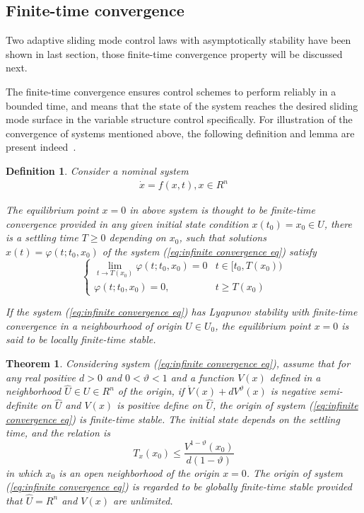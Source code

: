 \documentclass[3p]{elsarticle}
\theoremstyle{plain}
\newtheorem{mydef}{Definition}
\newtheorem{thm}{Theorem}
\begin{document}
\subsection{Finite-time convergence}
Two adaptive sliding mode control laws with asymptotically stability have been shown in last section, those finite-time convergence property will be discussed next.\par
The finite-time convergence ensures control schemes to perform reliably in a bounded time, and means that the state of the system reaches the desired sliding mode surface in the variable structure control specifically. For illustration of the convergence of systems mentioned above, the following definition and lemma are present indeed~\cite{Zhang2012Finite}.
\begin{mydef}
Consider a nominal system
\begin{align}
\dot x = f(x,t),x\in R^n\label{eq:infinite convergence eq}
\end{align}\par
The equilibrium point $x=0$ in above system is thought to be finite-time convergence provided in any given initial state condition $x(t_0)=x_0\in U$, there is a settling time $T\ge 0$ depending on $x_0$, such that solutions $x(t) = \varphi(t;t_0,x_0)$ of the system (\ref{eq:infinite convergence eq}) satisfy
\begin{equation*}
\begin{cases}
\lim\limits_{t\rightarrow T(x_0)}\varphi(t;t_0,x_0)=0 &t\in[t_0,T(x_0))\\
\varphi(t;t_0,x_0)=0,&t\ge T(x_0)
\end{cases}
\end{equation*}\par
If the system (\ref{eq:infinite convergence eq}) has Lyapunov stability with finite-time convergence in a neighbourhood of origin $U\in U_0$, the equilibrium point $x=0$ is said to be locally finite-time stable.
\end{mydef}
\begin{thm}\label{lem:1}
Considering system (\ref{eq:infinite convergence eq}), assume that for any real positive $d>0$ and $0<\vartheta<1$ and a function $V(x)$ defined in a neighborhood $\hat U\in U \in R^n$ of the origin, if $\dot{V}(x)+dV^{\vartheta}(x)$ is negative semi-definite on $\hat{U}$ and $V(x)$ is positive define on $\hat{U}$, the origin of system (\ref{eq:infinite convergence eq}) is finite-time stable. The initial state depends on the settling time, and the relation is
\begin{equation}
T_x(x_0)\le\frac{V^{1-\vartheta}(x_0)}{d(1-\vartheta)}
\end{equation}
in which $x_0$ is an open neighborhood of the origin $x=0$. The origin of system (\ref{eq:infinite convergence eq}) is regarded to be globally finite-time stable provided that $\hat{U}=R^n$ and $V(x)$ are unlimited.
\end{thm}
\end{document}
